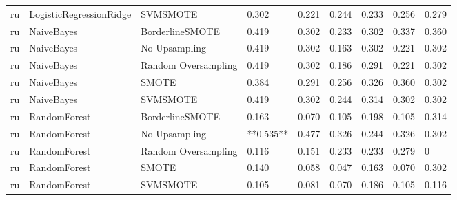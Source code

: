 \begin{tabular}{lllllllll}
      ru &      LogisticRegressionRidge &            SVMSMOTE &     0.302 &                     0.221 &                 0.244 &                  0.233 &                                   0.256 &     0.279 \\
      ru &                   NaiveBayes &     BorderlineSMOTE &     0.419 &                     0.302 &                 0.233 &                  0.302 &                                   0.337 &     0.360 \\
      ru &                   NaiveBayes &       No Upsampling &     0.419 &                     0.302 &                 0.163 &                  0.302 &                                   0.221 &     0.302 \\
      ru &                   NaiveBayes & Random Oversampling &     0.419 &                     0.302 &                 0.186 &                  0.291 &                                   0.221 &     0.302 \\
      ru &                   NaiveBayes &               SMOTE &     0.384 &                     0.291 &                 0.256 &                  0.326 &                                   0.360 &     0.302 \\
      ru &                   NaiveBayes &            SVMSMOTE &     0.419 &                     0.302 &                 0.244 &                  0.314 &                                   0.302 &     0.302 \\
      ru &                 RandomForest &     BorderlineSMOTE &     0.163 &                     0.070 &                 0.105 &                  0.198 &                                   0.105 &     0.314 \\
      ru &                 RandomForest &       No Upsampling & **0.535** &                     0.477 &                 0.326 &                  0.244 &                                   0.326 &     0.302 \\
      ru &                 RandomForest & Random Oversampling &     0.116 &                     0.151 &                 0.233 &                  0.233 &                                   0.279 &         0 \\
      ru &                 RandomForest &               SMOTE &     0.140 &                     0.058 &                 0.047 &                  0.163 &                                   0.070 &     0.302 \\
      ru &                 RandomForest &            SVMSMOTE &     0.105 &                     0.081 &                 0.070 &                  0.186 &                                   0.105 &     0.116 \\

\end{tabular}
